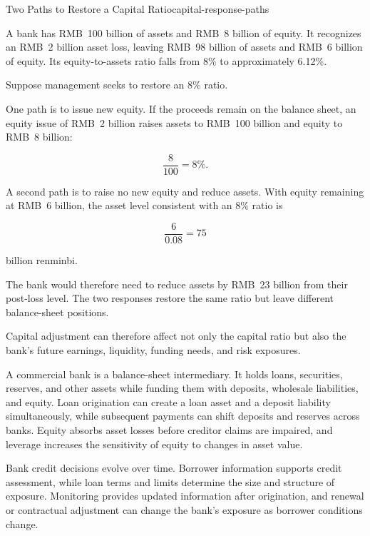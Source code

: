 \begin{example}{Two Paths to Restore a Capital Ratio}{capital-response-paths}

A bank has RMB~100 billion of assets and RMB~8 billion of equity. It recognizes an RMB~2 billion asset loss, leaving RMB~98 billion of assets and RMB~6 billion of equity. Its equity-to-assets ratio falls from 8\% to approximately 6.12\%.

Suppose management seeks to restore an 8\% ratio.

One path is to issue new equity. If the proceeds remain on the balance sheet, an equity issue of RMB~2 billion raises assets to RMB~100 billion and equity to RMB~8 billion:

\[
\frac{8}{100}=8\%.
\]

A second path is to raise no new equity and reduce assets. With equity remaining at RMB~6 billion, the asset level consistent with an 8\% ratio is

\[
\frac{6}{0.08}=75
\]

billion renminbi.

The bank would therefore need to reduce assets by RMB~23 billion from their post-loss level. The two responses restore the same ratio but leave different balance-sheet positions.

\end{example}

Capital adjustment can therefore affect not only the capital ratio but also the bank's future earnings, liquidity, funding needs, and risk exposures.



A commercial bank is a balance-sheet intermediary. It holds loans, securities, reserves, and other assets while funding them with deposits, wholesale liabilities, and equity. Loan origination can create a loan asset and a deposit liability simultaneously, while subsequent payments can shift deposits and reserves across banks. Equity absorbs asset losses before creditor claims are impaired, and leverage increases the sensitivity of equity to changes in asset value.

Bank credit decisions evolve over time. Borrower information supports credit assessment, while loan terms and limits determine the size and structure of exposure. Monitoring provides updated information after origination, and renewal or contractual adjustment can change the bank's exposure as borrower conditions change.

